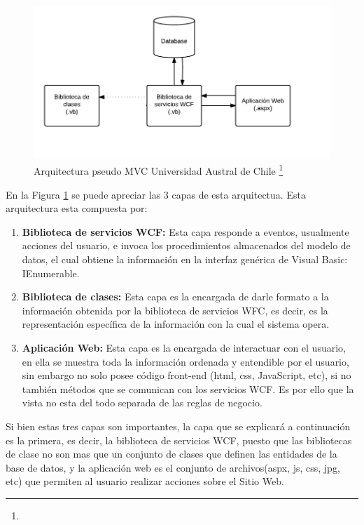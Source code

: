 	\begin{figure}[H]
		\centering
		\includegraphics[width=1\textwidth]{images/Capitulo_2/pseudoMVC.png}
		\caption[Arquitectura pseudo MVC Universidad Austral de Chile]{Arquitectura pseudo MVC Universidad Austral de Chile \footnote{}}
		\label{FiguraMVC}
	\end{figure}
	
En la Figura \ref{FiguraMVC} se puede apreciar las 3 capas de esta arquitectua. Esta arquitectura esta compuesta por:
\begin{enumerate}
	\item \textbf{Biblioteca de servicios WCF:} Esta capa responde a eventos, usualmente acciones del usuario, e invoca los procedimientos almacenados del modelo de datos, el cual obtiene la información en la interfaz genérica de Visual Basic: IEnumerable.
	
	\item \textbf{Biblioteca de clases:} Esta capa es la encargada de darle formato a la información obtenida por la biblioteca de servicios WFC, es decir, es la representación específica de la información con la cual el sistema opera.
	
	\item \textbf{Aplicación Web:} Esta capa es la encargada de interactuar con el usuario, en ella se muestra toda la información ordenada y entendible por el usuario, sin embargo no solo posee código front-end (html, css, JavaScript, etc), si no también métodos que se comunican con los servicios WCF. Es por ello que la vista  no esta del todo separada de las reglas de negocio.
\end{enumerate}

Si bien estas tres capas son importantes, la capa  que se explicará a continuación es la primera, es decir, la biblioteca de servicios WCF, puesto que las bibliotecas de clase no son mas que un conjunto de clases que definen las entidades de la base de datos, y la aplicación web es  el  conjunto de archivos(aspx, js, css, jpg, etc) que permiten al usuario realizar acciones sobre el Sitio Web.
\\

